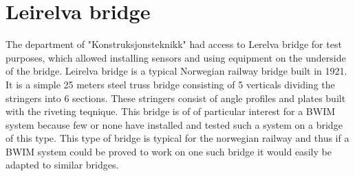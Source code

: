 \section{Leirelva bridge}
The department of "Konstruksjonsteknikk" had access to Lerelva bridge for test purposes, which allowed installing sensors and using equipment on the underside of the bridge.
Leirelva bridge is a typical Norwegian railway bridge built in 1921. It is a simple 25 meters steel truss bridge consisting of 5 verticals dividing the stringers into 6 sections. These stringers consist of angle profiles and plates built with the riveting teqnique.
This bridge is of of particular interest for a BWIM system because few or none have installed and tested such a system on a bridge of this type. This type of bridge is typical for the norwegian railway and thus if a BWIM system could be proved to work on one such bridge it would easily be adapted to similar bridges.
